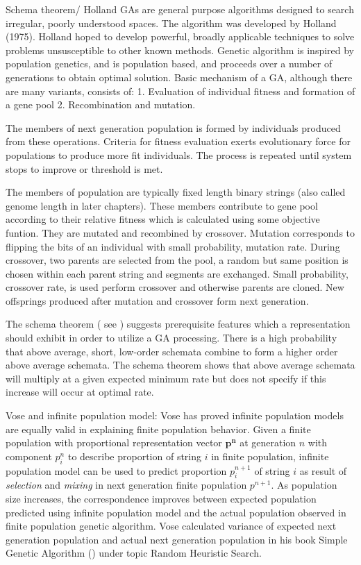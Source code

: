 
Schema theorem/ Holland
GAs are general purpose algorithms designed to search irregular, poorly understood spaces. The algorithm was developed by Holland (1975). Holland hoped to develop powerful, broadly applicable techniques to solve problems unsusceptible to other known methods. Genetic algorithm is inspired by population genetics, and is population based, and proceeds over a number of generations to obtain optimal solution. Basic mechanism of a GA, although there are many variants, consists of:
1. Evaluation of individual fitness and formation of a gene pool
2. Recombination and mutation.

The members of next generation population is formed by individuals produced from these operations. Criteria for fitness evaluation exerts evolutionary force for populations to produce more fit individuals. The process is repeated until system stops to improve or threshold is met.

The members of population are typically fixed length binary strings (also called genome length in later chapters). These members contribute to gene pool according to their relative fitness which is calculated using some objective funtion. They are mutated and recombined by crossover. Mutation corresponds to flipping the bits of an individual with small probability, mutation rate. During crossover, two parents are selected from the pool, a random but same position is chosen within each parent string and segments are exchanged. Small probability, crossover rate, is used perform crossover and otherwise parents are cloned. New offsprings produced after mutation and crossover form next generation.

The schema theorem ( see \cite{Holland1975}) suggests prerequisite features which a representation should exhibit in order to utilize a 
GA processing. There is a high probability that above average, short, low-order schemata combine to form a higher order above average schemata. The schema theorem shows that above average schemata will multiply at a given expected minimum rate but does not specify if this increase will occur at optimal rate.




Vose and infinite population model:
Vose has proved infinite population models are equally valid in explaining finite population behavior. Given a finite population with proportional representation vector $\bm{p^n}$ at generation $n$ with component $p_i^n$ to describe proportion of string $i$ in finite population, infinite population model can be used to predict proportion $p_i^{n+1}$ of string $i$ as result of \textit{selection} and \textit{mixing} in next generation finite population $p^{n+1}$. As population size increases, the correspondence improves between expected population predicted using infinite population model and the actual population observed in finite population genetic algorithm. Vose calculated variance of expected next generation population and actual next generation population in his book Simple Genetic Algorithm (\cite{Vose1999}) under topic Random Heuristic Search. 

